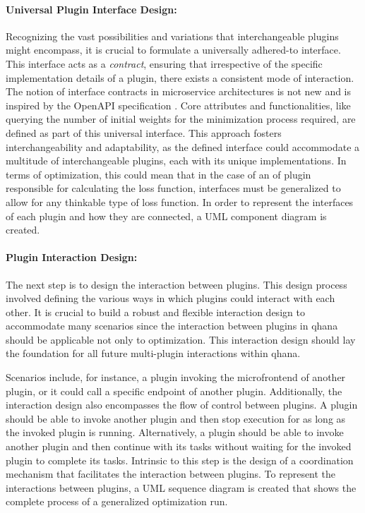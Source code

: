 \documentclass[
  a4paper,  %
  twoside,  %
  bibliography=totoc,
  headsepline,
  cleardoublepage=empty,
  parskip=half,
  draft=false
]{scrbook}
\begin{document}
\paragraph{Universal Plugin Interface Design:}
Recognizing the vast possibilities and variations that interchangeable plugins might encompass, it is crucial to formulate a universally adhered-to interface.
This interface acts as a \emph{contract}, ensuring that irrespective of the specific implementation details of a plugin, there exists a consistent mode of interaction.
The notion of interface contracts in microservice architectures is not new and is inspired by the OpenAPI specification \cite{Miller}.
Core attributes and functionalities, like querying the number of initial weights for the minimization process required, are defined as part of this universal interface.
This approach fosters interchangeability and adaptability, as the defined interface could accommodate a multitude of interchangeable plugins, each with its unique implementations.
In terms of optimization, this could mean that in the case of an \gls{of} plugin responsible for calculating the loss function, interfaces must be generalized to allow for any thinkable type of loss function.
In order to represent the interfaces of each plugin and how they are connected, a UML component diagram is created.

\paragraph{Plugin Interaction Design:}
The next step is to design the interaction between plugins.
This design process involved defining the various ways in which plugins could interact with each other.
It is crucial to build a robust and flexible interaction design to accommodate many scenarios since the interaction between plugins in \gls{qhana} should be applicable not only to optimization.
This interaction design should lay the foundation for all future multi-plugin interactions within \gls{qhana}.

Scenarios include, for instance, a plugin invoking the microfrontend of another plugin, or it could call a specific endpoint of another plugin.
Additionally, the interaction design also encompasses the flow of control between plugins.
A plugin should be able to invoke another plugin and then stop execution for as long as the invoked plugin is running.
Alternatively, a plugin should be able to invoke another plugin and then continue with its tasks without waiting for the invoked plugin to complete its tasks.
Intrinsic to this step is the design of a coordination mechanism that facilitates the interaction between plugins.
To represent the interactions between plugins, a UML sequence diagram is created that shows the complete process of a generalized optimization run.
\end{document}
